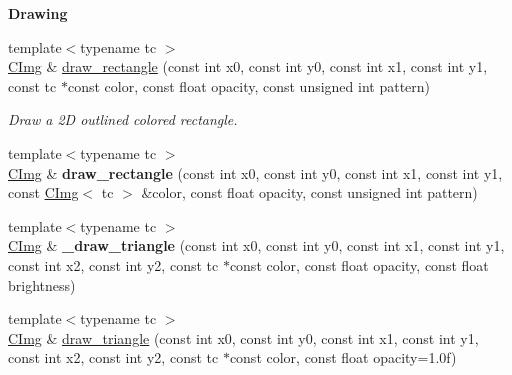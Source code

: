\begin{Indent}{\bf Drawing}
\begin{DoxyCompactItemize}
\item 
\hypertarget{structcimg__library_1_1_c_img_a7ba2ef792dd06903e218ba001819de1e}{{\footnotesize template$<$typename tc $>$ }\\\hyperlink{structcimg__library_1_1_c_img}{C\-Img} \& \hyperlink{structcimg__library_1_1_c_img_a7ba2ef792dd06903e218ba001819de1e}{draw\-\_\-rectangle} (const int x0, const int y0, const int x1, const int y1, const tc $\ast$const color, const float opacity, const unsigned int pattern)}\label{structcimg__library_1_1_c_img_a7ba2ef792dd06903e218ba001819de1e}

\begin{DoxyCompactList}\small\item\em Draw a 2\-D outlined colored rectangle. \end{DoxyCompactList}\item 
\hypertarget{structcimg__library_1_1_c_img_a7bf88063e399bdfcfe01efaef3cb4bed}{{\footnotesize template$<$typename tc $>$ }\\\hyperlink{structcimg__library_1_1_c_img}{C\-Img} \& {\bfseries draw\-\_\-rectangle} (const int x0, const int y0, const int x1, const int y1, const \hyperlink{structcimg__library_1_1_c_img}{C\-Img}$<$ tc $>$ \&color, const float opacity, const unsigned int pattern)}\label{structcimg__library_1_1_c_img_a7bf88063e399bdfcfe01efaef3cb4bed}

\item 
\hypertarget{structcimg__library_1_1_c_img_aef7606e94c034228e9f33252a2f60553}{{\footnotesize template$<$typename tc $>$ }\\\hyperlink{structcimg__library_1_1_c_img}{C\-Img} \& {\bfseries \-\_\-draw\-\_\-triangle} (const int x0, const int y0, const int x1, const int y1, const int x2, const int y2, const tc $\ast$const color, const float opacity, const float brightness)}\label{structcimg__library_1_1_c_img_aef7606e94c034228e9f33252a2f60553}

\item 
\hypertarget{structcimg__library_1_1_c_img_a75e37255f598921a5396ce2c11bf9f5a}{{\footnotesize template$<$typename tc $>$ }\\\hyperlink{structcimg__library_1_1_c_img}{C\-Img} \& \hyperlink{structcimg__library_1_1_c_img_a75e37255f598921a5396ce2c11bf9f5a}{draw\-\_\-triangle} (const int x0, const int y0, const int x1, const int y1, const int x2, const int y2, const tc $\ast$const color, const float opacity=1.\-0f)}\label{structcimg__library_1_1_c_img_a75e37255f598921a5396ce2c11bf9f5a}


\end{DoxyCompactItemize}
\end{Indent}
